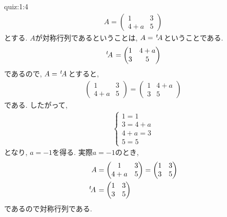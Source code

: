 \begin{answerof}{quiz:1:4}
  \begin{align*}
    A=
    \begin{pmatrix}
      1& 3\\
      4+a &5
    \end{pmatrix}
  \end{align*}
  とする.  $A$が対称行列であるということは, $A={\left.^{t}\!A\right.}$ということである.
  \begin{align*}
    {\left.^{t}\!A\right.}=
    \begin{pmatrix}
      1& 4+a\\
      3 &5
    \end{pmatrix}
  \end{align*}
  であるので, $A={\left.^{t}\!A\right.}$とすると,
  \begin{align*}
    \begin{pmatrix}
      1& 3\\
      4+a &5
    \end{pmatrix}
=
    \begin{pmatrix}
      1& 4+a\\
      3 &5
    \end{pmatrix}
  \end{align*}
  である.
  したがって, 
  \begin{align*}
    \begin{cases}
      1=1\\
      3=4+a\\
      4+a=3\\
      5=5
    \end{cases}
  \end{align*}
  となり, $a=-1$を得る.
  実際$a=-1$のとき,
  \begin{align*}
    A&=
    \begin{pmatrix}
      1& 3\\
      4+a &5
    \end{pmatrix}=
    \begin{pmatrix}
      1& 3\\
      3 &5
    \end{pmatrix}\\
    {\left.^{t}\!A\right.}&=
    \begin{pmatrix}
      1& 3\\
      3 &5
    \end{pmatrix}
  \end{align*}
  であるので対称行列である.
\end{answerof}

